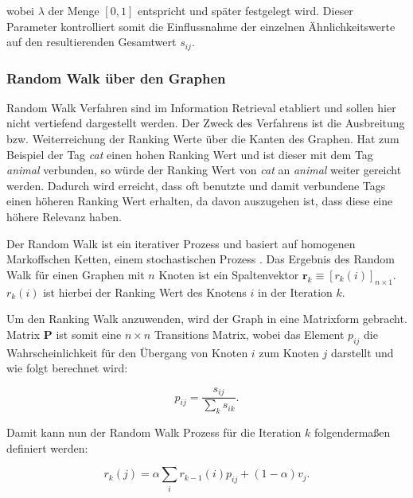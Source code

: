 wobei $\lambda$ der Menge $[0,1]$ entspricht und später festgelegt wird. Dieser Parameter kontrolliert somit die Einflussnahme der einzelnen Ähnlichkeitswerte auf den resultierenden Gesamtwert $s_{ij}$.




\subsubsection{Random Walk über den Graphen} %
\label{ssub:random_walk_ueber_den_graphen}
Random Walk Verfahren sind im Information Retrieval etabliert und sollen hier nicht vertiefend dargestellt werden. Der Zweck des Verfahrens ist die Ausbreitung bzw. Weiterreichung der Ranking Werte über die Kanten des Graphen. Hat zum Beispiel der Tag \emph{cat} einen hohen Ranking Wert und ist dieser mit dem Tag \emph{animal} verbunden, so würde der Ranking Wert von \emph{cat} an \emph{animal} weiter gereicht werden. Dadurch wird erreicht, dass oft benutzte und damit verbundene Tags einen höheren Ranking Wert erhalten, da davon auszugehen ist, dass diese eine höhere Relevanz haben.

Der Random Walk ist ein iterativer Prozess und basiert auf homogenen Markoffschen Ketten, einem stochastischen Prozess \cite{bronstein}. Das Ergebnis des Random Walk für einen Graphen mit $n$ Knoten ist ein Spaltenvektor $\textbf{r}_k \equiv [r_k(i)]_{n \times 1}$. $r_k(i)$ ist hierbei der Ranking Wert des Knotens $i$ in der Iteration $k$. 

Um den Ranking Walk anzuwenden, wird der Graph in eine Matrixform gebracht. Matrix \textbf{P} ist somit eine $n \times n$ Transitions Matrix, wobei das Element $p_{ij}$ die Wahrscheinlichkeit für den Übergang von Knoten $i$ zum Knoten $j$ darstellt und wie folgt berechnet wird:
\begin{figure}[hptb]
  \begin{equation}
  \label{fig:probabilityScore}
    p_{ij} = \frac{s_{ij}}{\sum_k s_{ik}}.
  \end{equation}
\end{figure}

Damit kann nun der Random Walk Prozess für die Iteration $k$ folgendermaßen definiert werden:
\begin{figure}[hptb]
  \begin{equation}
  \label{fig:randomWalk}
    r_k(j) = \alpha \sum_i r_{k-1}(i)p_{ij} + (1 - \alpha)v_j.
  \end{equation}
\end{figure}

